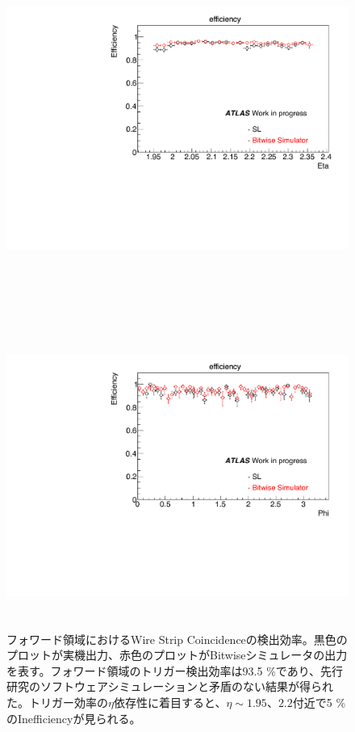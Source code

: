 \begin{figure}
    \begin{minipage}[b]{\linewidth}
    \centering
    \includegraphics[height=10cm]{fig/Test/A_SM_ws_eta.pdf}
    \end{minipage}\\
    \begin{minipage}[b]{\linewidth}
    \centering
    \includegraphics[height=10cm]{fig/Test/A_SM_ws_phi.pdf}
    \end{minipage}%
    \caption[Wire Strip Coincidenceの検出効率]{フォワード領域におけるWire Strip Coincidenceの検出効率。黒色のプロットが実機出力、赤色のプロットがBitwiseシミュレータの出力を表す。フォワード領域のトリガー検出効率は93.5 \%であり、先行研究のソフトウェアシミュレーションと矛盾のない結果が得られた。トリガー効率の$\eta$依存性に着目すると、$\eta\sim1.95、2.2$付近で5 \%のInefficiencyが見られる。}
    \label{SM_A_WS}
\end{figure}

